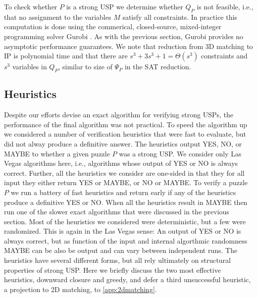 \documentclass[11pt]{article}
\begin{document}
To check whether $P$ is a strong USP we determine whether $Q_P$ is not feasible,
i.e., that no
assignment to the variables $M$ satisfy all constraints.  In
practice this computation is done using the commerical, closed-source, mixed-integer
programming solver Gurobi \cite{gurobi}.
As with the previous section, Gurobi provides no asymptotic performance
guarantees.  We note that reduction from
3D matching to IP is polynomial time and that there are $s^3 + 3s^3 + 1 = \Theta(s^3)$
constraints and $s^3$ variables in $Q_P$, similar to size of $\Psi_P$ in the SAT reduction.
 
\label{subsec:mip}




\subsection{Heuristics}
\label{sec:heuristic}

Despite our efforts devise an exact algorithm for verifying strong
USPs, the performance of the final algorithm was not practical.  To
speed the algorithm up we considered a number of verification
heuristics that were fast to evaluate, but did not alway produce a
definitive answer.  The heuristics output YES, NO, or MAYBE to whether
a given puzzle $P$ was a strong USP.  We consider only Las Vegas
algorithms here, i.e., algorithms whose output of YES or NO is
always correct.  Further, all the heuristics we consider are one-sided
in that they for all input they either return YES or MAYBE, or NO or
MAYBE.  To verify a puzzle $P$ we run a battery of fast heuristics and
return early if any of the heuristics produce a definitive YES or NO.
When all the heuristics result in MAYBE then run one of the slower
exact algorithms that were discussed in the previous section.  Most of
the heuristics we considered were deterministic, but a few were
randomized.  This is again in the Las Vegas sense: An output of YES or
NO is always correct, but as function of the input and internal
algorthmic randomness MAYBE can be also be output and can vary between
independent runs.  The heuristics have several different forms, but
all rely ultimately on structural properties of strong USP.  Here we
briefly discuss the two most effective heuristics, downward closure
and greedy, and defer a third unsuccessful heuristic, a projection to
2D matching, to \autoref{app:2dmatching}.
\end{document}
